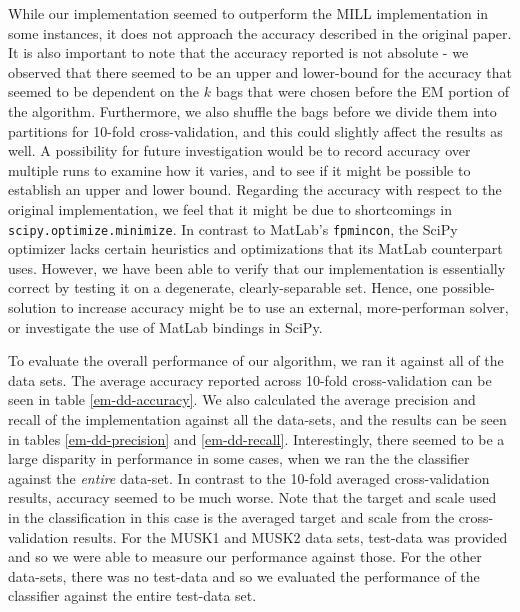 \documentclass[conference]{IEEEtran}
\begin{document}
While our implementation seemed to outperform the MILL implementation in some instances, it does not approach the accuracy described in the original paper. It is also important to note that the accuracy reported is not absolute - we observed that there seemed to be an upper and lower-bound for the accuracy that seemed to be dependent on the $k$ bags that were chosen before the EM portion of the algorithm. Furthermore, we also shuffle the bags before we divide them into partitions for 10-fold cross-validation, and this could slightly affect the results as well. A possibility for future investigation would be to record accuracy over multiple runs to examine how it varies, and to see if it might be possible to establish an upper and lower bound. Regarding the accuracy with respect to the original implementation, we feel that it might be due to shortcomings in \texttt{scipy.optimize.minimize}. In contrast to MatLab's \texttt{fpmincon}, the SciPy optimizer lacks certain heuristics and optimizations that its MatLab counterpart uses. However, we have been able to verify that our implementation is essentially correct by testing it on a degenerate, clearly-separable set. Hence, one possible-solution to increase accuracy might be to use an external, more-performan solver, or investigate the use of MatLab bindings in SciPy.

To evaluate the overall performance of our algorithm, we ran it against all of the data sets. The average accuracy reported across 10-fold cross-validation can be seen in table \ref{em-dd-accuracy}. We also calculated the average precision and recall of the implementation against all the data-sets, and the results can be seen in tables \ref{em-dd-precision} and \ref{em-dd-recall}. Interestingly, there seemed to be a large disparity in performance in some cases, when we ran the the classifier against the \textit{entire} data-set. In contrast to the 10-fold averaged cross-validation results, accuracy seemed to be much worse. Note that the target and scale used in the classification in this case is the averaged target and scale from the cross-validation results. For the MUSK1 and MUSK2 data sets, test-data was provided and so we were able to measure our performance against those. For the other data-sets, there was no test-data and so we evaluated the performance of the classifier against the entire test-data set. 
\end{document}
